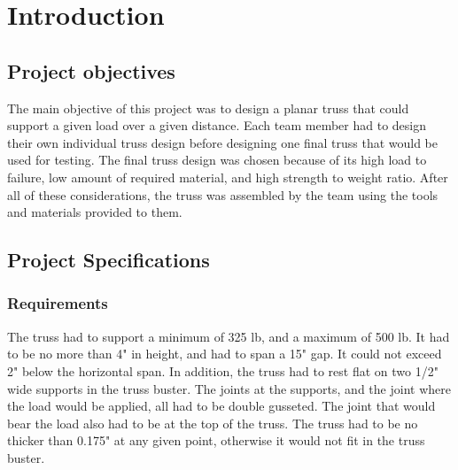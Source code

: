 \documentclass{article}
\let\Oldsection\section
\renewcommand{\section}{\FloatBarrier\Oldsection}
\let\Oldsubsection\subsection
\renewcommand{\subsection}{\FloatBarrier\Oldsubsection}
\let\Oldsubsubsection\subsubsection
\renewcommand{\subsubsection}{\FloatBarrier\Oldsubsubsection}
\begin{document}
\newpage

\section{Introduction}

\subsection{Project objectives}

The main objective of this project was to design a planar truss that could support a given load over a given distance. Each team member had to design their own individual truss design before designing one final truss that would be used for testing. The final truss design was chosen because of its high load to failure, low amount of required material, and high strength to weight ratio. After all of these considerations, the truss was assembled by the team using the tools and materials provided to them.  


\subsection{Project Specifications}

\subsubsection{Requirements}

The truss had to support a minimum of 325 lb, and a maximum of 500 lb. It had to be no more than 4" in height, and had to span a 15" gap. It could not exceed 2" below the horizontal span. In addition, the truss had to rest flat on two 1/2" wide supports in the truss buster. The joints at the supports, and the joint where the load would be applied, all had to be double gusseted. The joint that would bear the load also had to be at the top of the truss. The truss had to be no thicker than 0.175" at any given point, otherwise it would not fit in the truss buster. 
\end{document}
